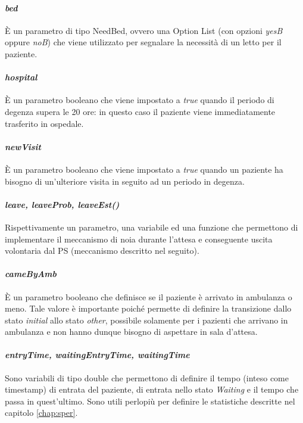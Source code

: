 \paragraph{\textit{bed}}
È un parametro di tipo NeedBed, ovvero una Option List (con opzioni \textit{yesB} oppure \textit{noB}) che viene utilizzato per segnalare la necessità di un letto per il paziente.

\paragraph{\textit{hospital}}
È un parametro booleano che viene impostato a \textit{true} quando il periodo di degenza supera le 20 ore: in questo caso il paziente viene immediatamente trasferito in ospedale. 

\paragraph{\textit{newVisit}}
È un parametro booleano che viene impostato a \textit{true} quando un paziente ha bisogno di un'ulteriore visita in seguito ad un periodo in degenza. 

\paragraph{\textit{leave, leaveProb, leaveEst()}}
Rispettivamente un parametro, una variabile ed una funzione che permettono di implementare il meccanismo di noia durante l’attesa e conseguente uscita volontaria dal PS (meccanismo descritto nel seguito).

\paragraph{\textit{cameByAmb}}
È un parametro booleano che definisce se il paziente è arrivato in ambulanza o meno. Tale valore è importante poiché permette di definire la transizione dallo stato \textit{initial} allo stato \textit{other}, possibile solamente per i pazienti che arrivano in ambulanza e non hanno dunque bisogno di aspettare in sala d'attesa.

\paragraph{\textit{entryTime, waitingEntryTime, waitingTime}}
Sono variabili di tipo double che permettono di definire il tempo (inteso come timestamp) di entrata del paziente, di entrata nello stato \textit{Waiting} e il tempo che passa in quest'ultimo. 
Sono utili perlopiù per definire le statistiche descritte nel capitolo \ref{chap:sper}. 

